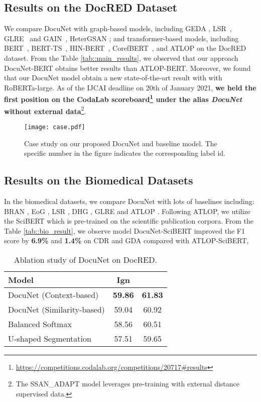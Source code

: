 \documentclass{article}
\begin{document}
\subsection{Results on the DocRED Dataset}
We compare DocuNet with graph-based models, including GEDA \cite{li2020graph}, LSR~\cite{Nan2020ReasoningWL}, GLRE~\cite{wang2020global} and GAIN~\cite{zeng2020double}, HeterGSAN \cite{xu2020document}; and transformer-based models, including BERT~\cite{Wang2019FinetuneBF}, BERT-TS~\cite{Wang2019FinetuneBF}, HIN-BERT~\cite{tang2020hin}, CorefBERT~\cite{Ye2020CoreferentialRL}, and ATLOP on the DocRED dataset. From the Table \ref{tab::main_results}, we observed that our approach DocuNet-BERT obtains better results than ATLOP-BERT. Moreover, we found that our DocuNet model obtain a new state-of-the-art result  with with RoBERTa-large. As of the IJCAI deadline on 20th of January 2021, \textbf{we held the first position on the CodaLab scoreboard\footnote{\url{https://competitions.codalab.org/competitions/20717\#results}} under the alias \emph{DocuNet}  without external data}\footnote{The SSAN\_ADAPT model leverages pre-training with external distance supervised data.}. 

 \begin{figure*}[h]
  \centering 
  \texttt{[image: case.pdf]} 
  \caption{Case study on our proposed DocuNet and baseline model. The specific number in the figure indicates the corresponding label id.}
  \label{case}
\end{figure*}

\subsection{Results on the Biomedical Datasets}
In the biomedical datasets, we compare DocuNet with lots of baselines including: BRAN \cite{Verga2018SimultaneouslyST}, EoG \cite{Christopoulou2019ConnectingTD}, LSR \cite{Nan2020ReasoningWL}, DHG \cite{zhang2020document}, GLRE \cite{wang2020global} and ATLOP \cite{zhou2020document}. Following ATLOP\cite{zhou2020document}, we utilize the SciBERT \cite{Beltagy2019SciBERTAP} which is pre-trained on the scientific publication corpora. From the Table \ref{tab::bio_result}, we observe model DocuNet-SciBERT  improved the F1 score by \textbf{6.9\%} and \textbf{1.4\%} on CDR and GDA compared with ATLOP-SciBERT, 


 
\begin{table}[!t]
\centering
\begin{tabular}{p{5.2cm}cc}
         \toprule
         \textbf{Model} & Ign  &  \\
         \midrule
         DocuNet (Context-based) &\textbf{59.86} &\textbf{61.83}  \\
         DocuNet (Similarity-based)&59.04 &60.92 \\
         \midrule
           Balanced Softmax&58.56  &60.51  \\
           U-shaped Segmentation&57.51  &59.65  \\
         \bottomrule
    \end{tabular}
\caption{Ablation study of DocuNet on DocRED.}
    \label{tab::ablation}
\end{table}
\end{document}
